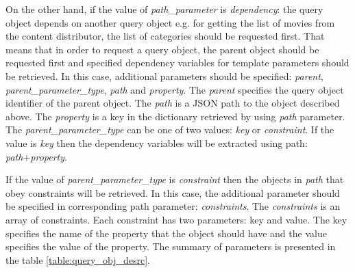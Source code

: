 On the other hand, if the value of \textit{path\_parameter} is \textit{dependency}: the query object depends on another query object e.g. for getting the list of movies from the content distributor, the list of categories should be requested first. That means that in order to request a query object, the parent object should be requested first and specified dependency variables for template parameters should be retrieved. In this case, additional parameters should be specified: \textit{parent}, \textit{parent\_parameter\_type}, \textit{path} and \textit{property}. The \textit{parent} specifies the query object identifier of the parent object. The \textit{path} is a JSON path to the object described above. The \textit{property} is a key in the dictionary retrieved by using \textit{path} parameter. The \textit{parent\_parameter\_type} can be one of two values: \textit{key} or \textit{constraint}. If the value is \textit{key} then the dependency variables will be extracted using path: \textit{path}+\textit{property}.

If the value of \textit{parent\_parameter\_type} is \textit{constraint} then the objects in \textit{path} that obey constraints will be retrieved. In this case, the additional parameter should be specified in corresponding path parameter: \textit{constraints}. The \textit{constraints} is an array of constraints. Each constraint has two parameters: key and value. The key specifies the name of the property that the object should have and the value specifies the value of the property. The summary of parameters is presented in the table \ref{table:query_obj_desrc}.


